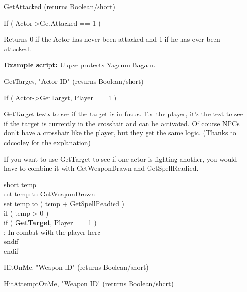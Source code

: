 GetAttacked (returns Boolean/short)

If ( Actor-\textgreater GetAttacked == 1 )

Returns 0 if the Actor has never been attacked and 1 if he has ever been
attacked.

\textbf{Example script:} Uupse protects Yagrum Bagarn:



GetTarget, "Actor ID" (returns Boolean/short)

If ( Actor-\textgreater GetTarget, Player == 1 )

GetTarget tests to see if the target is in focus. For the player, it's
the test to see if the target is currently in the crosshair and can be
activated. Of course NPCs don't have a crosshair like the player, but
they get the same logic. (Thanks to cdcooley for the explanation)

If you want to use GetTarget to see if one actor is fighting another,
you would have to combine it with GetWeaponDrawn and GetSpellReadied.

short temp\\
set temp to GetWeaponDrawn\\
set temp to ( temp + GetSpellReadied )\\
if ( temp \textgreater{} 0 )\\
\hspace*{0.333em}\hspace*{0.333em}\hspace*{0.333em}\hspace*{0.333em}if (
\textbf{GetTarget}, Player == 1 )\\
\hspace*{0.333em}\hspace*{0.333em}\hspace*{0.333em}\hspace*{0.333em}\hspace*{0.333em}\hspace*{0.333em}
; In combat with the player here\\
\hspace*{0.333em}\hspace*{0.333em}\hspace*{0.333em}\hspace*{0.333em}endif\\
endif

HitOnMe, "Weapon ID" (returns Boolean/short)

HitAttemptOnMe, "Weapon ID" (returns Boolean/short)

